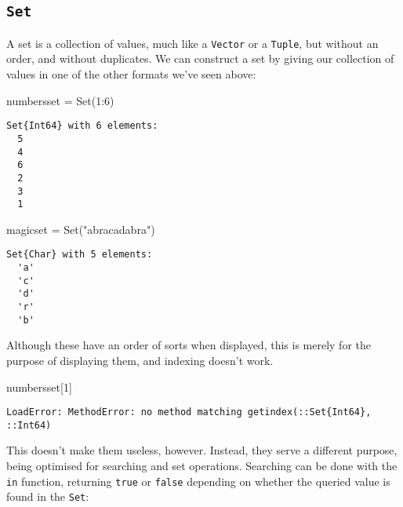 \documentclass[
  letterpaper,
  DIV=11,
  numbers=noendperiod]{scrreprt}
\newenvironment{Shaded}{\begin{snugshade}}{\end{snugshade}}
\newcommand{\FloatTok}[1]{\textcolor[rgb]{0.68,0.00,0.00}{#1}}
\newcommand{\FunctionTok}[1]{\textcolor[rgb]{0.28,0.35,0.67}{#1}}
\newcommand{\NormalTok}[1]{\textcolor[rgb]{0.00,0.23,0.31}{#1}}
\newcommand{\OperatorTok}[1]{\textcolor[rgb]{0.37,0.37,0.37}{#1}}
\newcommand{\StringTok}[1]{\textcolor[rgb]{0.13,0.47,0.30}{#1}}
\begin{document}
\hypertarget{set}{%
\subsection{\texorpdfstring{\texttt{Set}}{Set}}\label{set}}

A set is a collection of values, much like a \texttt{Vector} or a
\texttt{Tuple}, but without an order, and without duplicates. We can
construct a set by giving our collection of values in one of the other
formats we've seen above:

\begin{Shaded}
\begin{Highlighting}[]
\NormalTok{numbersset }\OperatorTok{=} \FunctionTok{Set}\NormalTok{(}\FloatTok{1}\OperatorTok{:}\FloatTok{6}\NormalTok{)}
\end{Highlighting}
\end{Shaded}

\begin{verbatim}
Set{Int64} with 6 elements:
  5
  4
  6
  2
  3
  1
\end{verbatim}

\begin{Shaded}
\begin{Highlighting}[]
\NormalTok{magicset }\OperatorTok{=} \FunctionTok{Set}\NormalTok{(}\StringTok{"abracadabra"}\NormalTok{)}
\end{Highlighting}
\end{Shaded}

\begin{verbatim}
Set{Char} with 5 elements:
  'a'
  'c'
  'd'
  'r'
  'b'
\end{verbatim}

Although these have an order of sorts when displayed, this is merely for
the purpose of displaying them, and indexing doesn't work.

\begin{Shaded}
\begin{Highlighting}[]
\NormalTok{numbersset[}\FloatTok{1}\NormalTok{]}
\end{Highlighting}
\end{Shaded}

\begin{verbatim}
LoadError: MethodError: no method matching getindex(::Set{Int64}, ::Int64)
\end{verbatim}

This doesn't make them useless, however. Instead, they serve a different
purpose, being optimised for searching and set operations. Searching can
be done with the \texttt{in} function, returning \texttt{true} or
\texttt{false} depending on whether the queried value is found in the
\texttt{Set}:
\end{document}
